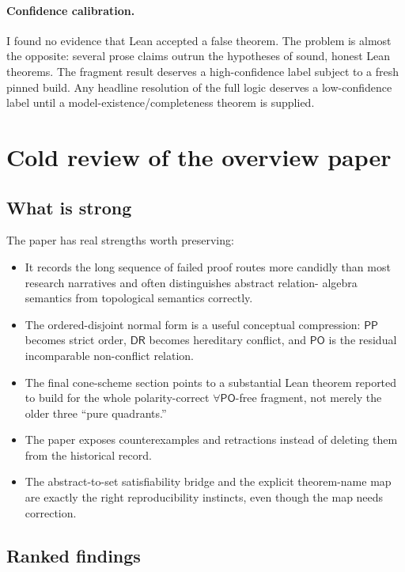 \documentclass[11pt]{article}
\newcommand{\PO}{\ensuremath{\mathsf{PO}}}
\newcommand{\PP}{\ensuremath{\mathsf{PP}}}
\newcommand{\DR}{\ensuremath{\mathsf{DR}}}
\begin{document}
\paragraph{Confidence calibration.}
I found no evidence that Lean accepted a false theorem.  The problem is almost
the opposite: several prose claims outrun the hypotheses of sound, honest Lean
theorems.  The fragment result deserves a high-confidence label subject to a
fresh pinned build.  Any headline resolution of the full logic deserves a
low-confidence label until a model-existence/completeness theorem is supplied.

\section{Cold review of the overview paper}

\subsection{What is strong}

The paper has real strengths worth preserving:
\begin{itemize}
  \item It records the long sequence of failed proof routes more candidly than
        most research narratives and often distinguishes abstract relation-
        algebra semantics from topological semantics correctly.
  \item The ordered-disjoint normal form is a useful conceptual compression:
        \PP{} becomes strict order, \DR{} becomes hereditary conflict, and
        \PO{} is the residual incomparable non-conflict relation.
  \item The final cone-scheme section points to a substantial Lean theorem
        reported to build
        for the whole polarity-correct \(\forall\PO\)-free fragment, not merely
        the older three ``pure quadrants.''
  \item The paper exposes counterexamples and retractions instead of deleting
        them from the historical record.
  \item The abstract-to-set satisfiability bridge and the explicit theorem-name
        map are exactly the right reproducibility instincts, even though the
        map needs correction.
\end{itemize}

\subsection{Ranked findings}
\end{document}
